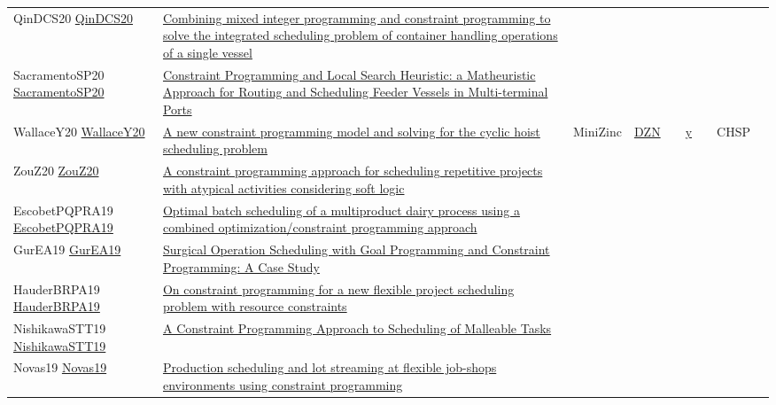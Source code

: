 {\begin{longtable}{p{3cm}p{7cm}lllllll}
QinDCS20 \href{https://doi.org/10.1016/j.ejor.2020.02.021}{QinDCS20} &  \href{articles/QinDCS20.pdf}{Combining mixed integer programming and constraint programming to solve the integrated scheduling problem of container handling operations of a single vessel} &  &  &  &  &  &  & \\
SacramentoSP20 \href{https://doi.org/10.1007/s43069-020-00036-x}{SacramentoSP20} &  \href{articles/SacramentoSP20.pdf}{Constraint Programming and Local Search Heuristic: a Matheuristic Approach for Routing and Scheduling Feeder Vessels in Multi-terminal Ports} &  &  &  &  &  &  & \\
WallaceY20 \href{https://doi.org/10.1007/s10601-020-09316-z}{WallaceY20} &  \href{articles/WallaceY20.pdf}{A new constraint programming model and solving for the cyclic hoist scheduling problem} & MiniZinc & \href{https://data.4tu.nl/articles/_/12912413}{DZN} &  & \href{https://data.4tu.nl/articles/_/12912413}{y} &  & CHSP & \\
ZouZ20 \href{https://api.semanticscholar.org/CorpusID:208840808}{ZouZ20} &  \href{}{A constraint programming approach for scheduling repetitive projects with atypical activities considering soft logic} &  &  &  &  &  &  & \\
EscobetPQPRA19 \href{https://doi.org/10.1016/j.compchemeng.2018.08.040}{EscobetPQPRA19} &  \href{articles/EscobetPQPRA19.pdf}{Optimal batch scheduling of a multiproduct dairy process using a combined optimization/constraint programming approach} &  &  &  &  &  &  & \\
GurEA19 \href{https://api.semanticscholar.org/CorpusID:88492001}{GurEA19} &  \href{articles/GurEA19.pdf}{Surgical Operation Scheduling with Goal Programming and Constraint Programming: A Case Study} &  &  &  &  &  &  & \\
HauderBRPA19 \href{https://api.semanticscholar.org/CorpusID:67855609}{HauderBRPA19} &  \href{articles/HauderBRPA19.pdf}{On constraint programming for a new flexible project scheduling problem with resource constraints} &  &  &  &  &  &  & \\
NishikawaSTT19 \href{http://www.ijnc.org/index.php/ijnc/article/view/201}{NishikawaSTT19} &  \href{}{A Constraint Programming Approach to Scheduling of Malleable Tasks} &  &  &  &  &  &  & \\
Novas19 \href{https://doi.org/10.1016/j.cie.2019.07.011}{Novas19} &  \href{articles/Novas19.pdf}{Production scheduling and lot streaming at flexible job-shops environments using constraint programming} &  &  &  &  &  &  & \\

\end{longtable}}
